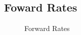 \documentclass[
  letterpaper,
  DIV=11,
  numbers=noendperiod]{scrartcl}
\begin{document}
\newpage

\subsection{Foward Rates}\label{foward-rates}

\begin{figure}[H]


\caption{\label{fig-forward_rates}Forward Rates}

\end{figure}%
\end{document}
